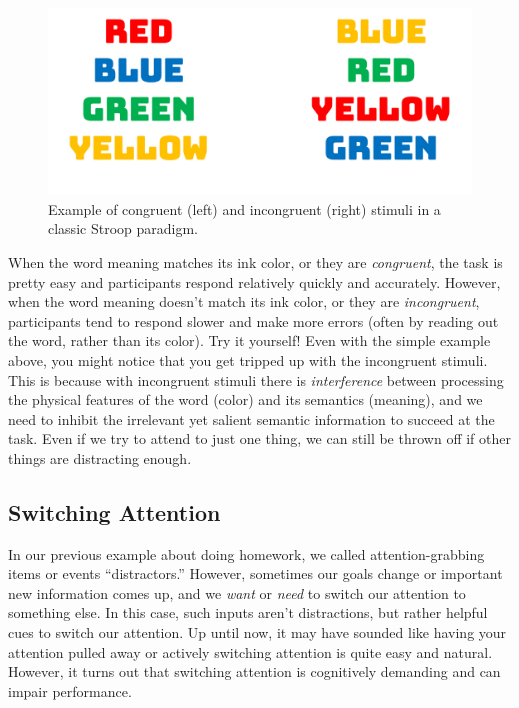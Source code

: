 \documentclass[
]{krantz}
\begin{document}
\begin{figure}

{\centering \includegraphics[width=0.6\linewidth]{images/3_attention/stroop} 

}

\caption{Example of congruent (left) and incongruent (right) stimuli in a classic Stroop paradigm.}\label{fig:stroop}
\end{figure}

When the word meaning matches its ink color, or they are \emph{congruent}, the task is pretty easy and participants respond relatively quickly and accurately. However, when the word meaning doesn't match its ink color, or they are \emph{incongruent}, participants tend to respond slower and make more errors (often by reading out the word, rather than its color). Try it yourself! Even with the simple example above, you might notice that you get tripped up with the incongruent stimuli. This is because with incongruent stimuli there is \emph{interference} between processing the physical features of the word (color) and its semantics (meaning), and we need to inhibit the irrelevant yet salient semantic information to succeed at the task. Even if we try to attend to just one thing, we can still be thrown off if other things are distracting enough.

\subsection*{Switching Attention}\label{switching-attention}


In our previous example about doing homework, we called attention-grabbing items or events ``distractors.'' However, sometimes our goals change or important new information comes up, and we \emph{want} or \emph{need} to switch our attention to something else. In this case, such inputs aren't distractions, but rather helpful cues to switch our attention. Up until now, it may have sounded like having your attention pulled away or actively switching attention is quite easy and natural. However, it turns out that switching attention is cognitively demanding and can impair performance.
\end{document}
